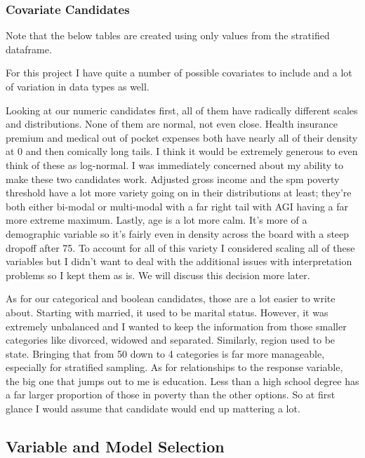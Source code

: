 \subsubsection*{Covariate Candidates}

Note that the below tables are created using only values from the stratified dataframe.







For this project I have quite a number of possible covariates to include and a lot of variation in data types as well. 

Looking at our numeric candidates first, all of them have radically different scales and distributions. None of them are normal, not even close. Health insurance premium and medical out of pocket expenses both have nearly all of their density at 0 and then comically long tails. I think it would be extremely generous to even think of these as log-normal. I was immediately concerned about my ability to make these two candidates work. Adjusted gross income and the spm poverty threshold have a lot more variety going on in their distributions at least; they're both either bi-modal or multi-modal with a far right tail with AGI having a far more extreme maximum. Lastly, age is a lot more calm. It's more of a demographic variable so it's fairly even in density across the board with a steep dropoff after 75. To account for all of this variety I considered scaling all of these variables but I didn't want to deal with the additional issues with interpretation problems so I kept them as is. We will discuss this decision more later.

As for our categorical and boolean candidates, those are a lot easier to write about. Starting with married, it used to be marital status. However, it was extremely unbalanced and I wanted to keep the information from those smaller categories like divorced, widowed and separated. Similarly, region used to be state. Bringing that from 50 down to 4 categories is far more manageable, especially for stratified sampling. As for relationships to the response variable, the big one that jumps out to me is education. Less than a high school degree has a far larger proportion of those in poverty than the other options. So at first glance I would assume that candidate would end up mattering a lot. 

\subsection*{Variable and Model Selection}


